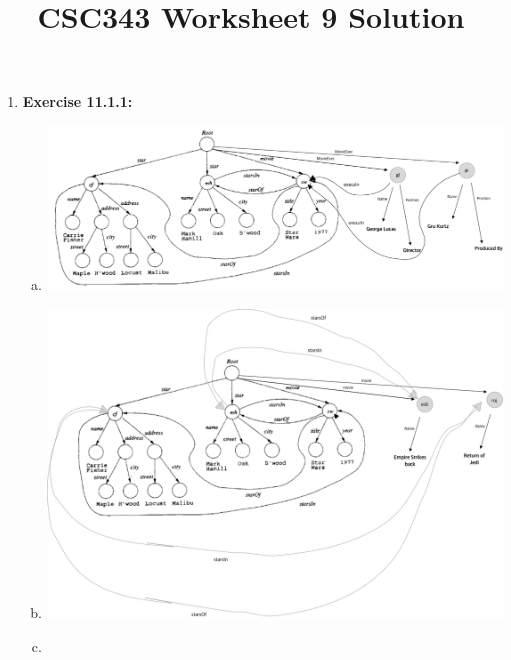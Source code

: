 \documentclass[12pt]{article}
\begin{document}
\title{CSC343 Worksheet 9 Solution}
\maketitle

\bigskip

\begin{enumerate}[1.]
    \item \textbf{Exercise 11.1.1:}

    \bigskip

    \begin{enumerate}[a)]
        \item

    \begin{center}
    \includegraphics[width=\linewidth]{images/worksheet_9_solution_4.png}
    \end{center}

        \item

    \begin{center}
    \includegraphics[width=\linewidth]{images/worksheet_9_solution_5.png}
    \end{center}


        \item


\end{enumerate}
\end{enumerate}
\end{document}

